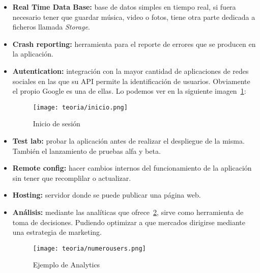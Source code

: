 \begin{itemize}
	\item \textbf{Real Time Data Base:} base de datos simples en tiempo real, si fuera necesario tener que guardar música, video o fotos, tiene otra parte dedicada a ficheros llamada \emph{Storage}.
	\item \textbf{Crash reporting:} herramienta para el reporte de errores que se producen en la aplicación.
	\item \textbf{Autentication:} integración con la mayor cantidad de aplicaciones de redes sociales en las que su API permite la identificación de usuarios. Obviamente el propio Google es una de ellas. Lo podemos ver en la siguiente imagen~\ref{fig:inicio}:
	\begin{figure}[H]
		\centering
		\texttt{[image: teoria/inicio.png]}
		\caption{Inicio de sesión}\label{fig:inicio}
	\end{figure}
	\item \textbf{Test lab:} probar la aplicación antes de realizar el despliegue de la misma. También el lanzamiento de pruebas alfa y beta.
	\item \textbf{Remote config:} hacer cambios internos del funcionamiento de la aplicación sin tener que recomplilar o actualizar.
	\item \textbf{Hosting:} servidor donde se puede publicar una página web.
	\item \textbf{Análisis:} mediante las analíticas que ofrece~\ref{fig:numerousers}, sirve como herramienta de toma de decisiones. Pudiendo optimizar a que mercados dirigirse mediante una estrategia de marketing.
	\begin{figure}[H]
		\centering
		\texttt{[image: teoria/numerousers.png]}
		\caption{Ejemplo de Analytics}\label{fig:numerousers}
	\end{figure}
\end{itemize}
